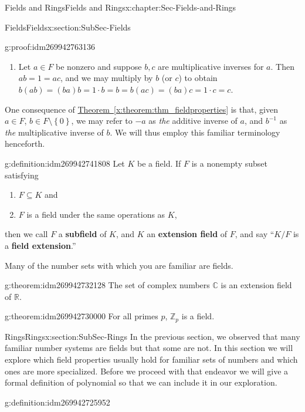 \documentclass[oneside,10pt,]{book}
\newcommand{\terminology}[1]{\textbf{#1}}
\numberwithin{equation}{section}
\newcommand{\set}[1]{\left\{ {#1} \right\}}
\def\C{{\mathbb C}}
\def\Z{{\mathbb Z}}
\def\R{{\mathbb R}}
\begin{document}
\begin{chapterptx}{Fields and Rings}{}{Fields and Rings}{}{}{x:chapter:Sec-Fields-and-Rings}
\begin{sectionptx}{Fields}{}{Fields}{}{}{x:section:SubSec-Fields}
\begin{proofptx}{}{g:proof:idm269942763136}
\begin{enumerate}
\item{}Let \(a\in F\) be nonzero and suppose \(b,c\) are multiplicative inverses for \(a\). Then \(ab = 1 = ac\), and we may multiply by \(b\) (or \(c\)) to obtain \(b(ab) = (ba)b = 1\cdot b = b = b(ac) = (ba)c = 1\cdot c = c\).%
\end{enumerate}
\end{proofptx}
One consequence of \hyperref[x:theorem:thm_fieldproperties]{Theorem~\ref{x:theorem:thm_fieldproperties}} is that, given \(a\in F\), \(b\in F\setminus \set{0}\), we may refer to \(-a\) as \emph{the} additive inverse of \(a\), and \(b^{-1}\) as \emph{the} multiplicative inverse of \(b\). We will thus employ this familiar terminology henceforth.%
\begin{definition}{}{g:definition:idm269942741808}%
Let \(K\) be a field. If \(F\) is a nonempty subset satisfying%
\begin{enumerate}
\item{}\(F\subseteq K\) and%
\item{}\(F\) is a field under the same operations as \(K\),%
\end{enumerate}
%
\par
then we call \(F\) a \terminology{subfield} of \(K\), and \(K\) an \terminology{extension field} of \(F\), and say ``\(K/F\) is a \terminology{field extension}.''%
\end{definition}
 Many of the number sets with which you are familiar are fields. \begin{theorem}{}{}{g:theorem:idm269942732128}%
The set of complex numbers \(\C\) is an extension field of \(\R\).%
\end{theorem}
\begin{theorem}{}{}{g:theorem:idm269942730000}%
For all primes \(p\), \(\Z_p\) is a field.%
\end{theorem}
\end{sectionptx}
%
%
\typeout{************************************************}
\typeout{************************************************}
%
\begin{sectionptx}{Rings}{}{Rings}{}{}{x:section:SubSec-Rings}
In the previous section, we observed that many familiar number systems are fields but that some are not. In this section we will explore which field properties usually hold for familiar sets of numbers and which ones are more specialized. Before we proceed with that endeavor we will give a formal definition of polynomial so that we can include it in our exploration.%
\begin{definition}{}{g:definition:idm269942725952}%

\end{definition}
\end{sectionptx}
\end{chapterptx}
\end{document}
